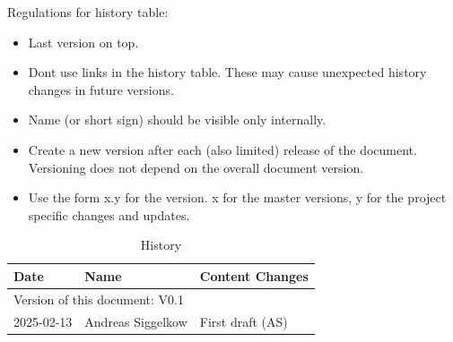Regulations for history table:
\begin{itemize}
  \item Last version on top.
  \item Dont use links in the history table. These may cause unexpected history changes in future versions.
  \item Name (or short sign) should be visible only internally.
  \item Create a new version after each (also limited) release of the document. Versioning does not depend on the overall document version.
  \item Use the form x.y for the version. x for the master versions, y for the project specific changes and updates.
\end{itemize}

\begin{table}[H]
\caption{History}
\label{tab:aluhistory01}
\centering
\begin{tabularx}{\textwidth}{|X |X |X |}
  \hline
  Date & Name & Content Changes \\
  \hline
  \multicolumn{3}{|l|}{Version of this document: V0.1} \\
  \hline
  2025-02-13 & Andreas Siggelkow & First draft (AS) \\
  \hline
\end{tabularx}
\end{table}
